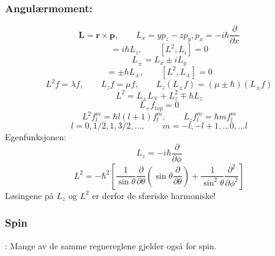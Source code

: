 \documentclass[a4paper,norsk, 10pt]{article}
\begin{document}
\subsubsection{Angulærmoment:}
\begin{equation}
\mathbf{L} = \mathbf{r}\times\mathbf{p}, \qquad L_x = yp_z - zp_y, p_x = -i\hbar \frac{\partial}{\partial x}
\end{equation}
\begin{equation}
[L_x,L_y] = i\hbar L_z, \qquad [L^2,L_i] = 0
\end{equation}
\begin{equation}
L_{\pm} = L_x \pm iL_y
\end{equation}
\begin{equation}
[L_z,L_{\pm}] = \pm \hbar L_{\pm},\qquad [L^2,L_{\pm}] = 0
\end{equation}
\begin{equation}
L^2f = \lambda f,\qquad L_zf = \mu f, \qquad L_z(L_{\pm}f)=(\mu\pm\hbar)(L_{\pm}f)
\end{equation}
\begin{equation}
L^2 = L_{\pm}L_{\mp} + L^2_z \mp \hbar L_z
\end{equation}
\begin{equation}
L_+f_{top} = 0
\end{equation}
\begin{equation}
L^2f_l^m = \hbar l(l+1)f_l^m, \qquad L_z f_l^m = \hbar m f_l^m
\end{equation}
\begin{equation}
l = 0,1/2,1,3/2,..., \qquad m = -l,-l+1,...0,... l
\end{equation}
Egenfunksjonen:
\begin{equation}
L_z = -i\hbar \frac{\partial}{\partial\phi}
\end{equation}
\begin{equation}
L^2 = -\hbar^2\left[\frac{1}{\sin\theta}\frac{\partial}{\partial\theta}\left(\sin\theta\frac{\partial}{\partial \theta}\right) + \frac{1}{\sin^2\theta}\frac{\partial^2}{\partial \phi^2}\right]
\end{equation}
Løsingene på $L_z$ og $L^2$ er derfor de sfæriske harmoniske!
\subsubsection{Spin}:
Mange av de samme regnereglene gjelder også for spin.
\end{document}
